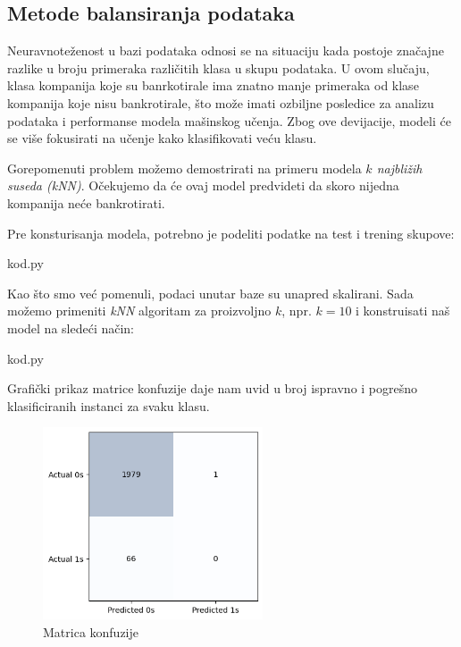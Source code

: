 \documentclass[12pt]{article}
\theoremstyle{definition}
\theoremstyle{remark}
\begin{document}
\newpage

\subsection{Metode balansiranja podataka} 

Neuravnoteženost u bazi podataka odnosi se na situaciju kada postoje značajne razlike u broju primeraka različitih klasa u skupu podataka. U ovom slučaju, klasa kompanija koje su banrkotirale ima znatno manje primeraka od klase kompanija koje nisu bankrotirale, što može imati ozbiljne posledice za analizu podataka i performanse modela mašinskog učenja. Zbog ove devijacije, modeli će se više fokusirati na učenje kako klasifikovati veću klasu. 

Gorepomenuti problem možemo demostrirati na primeru modela
\emph{$k$ najbližih suseda (kNN)}. Očekujemo da će ovaj model predvideti da skoro nijedna kompanija neće bankrotirati. 

Pre konsturisanja modela, potrebno je podeliti podatke na test i trening skupove:

\hfill

{kod.py}

\hfill

Kao što smo već pomenuli, podaci unutar baze su unapred skalirani. Sada možemo primeniti \emph{kNN} algoritam za proizvoljno $k$, npr. $k=10$ i konstruisati naš model na sledeći način:

\hfill

{kod.py}

\hfill



Grafički prikaz matrice konfuzije daje nam uvid u broj ispravno i pogrešno klasificiranih instanci za svaku klasu.

\begin{figure}[htp]
    \centering
    \includegraphics[width=6.5cm]{output_6_0.png}
    \caption{Matrica konfuzije}
    \label{fig:galaxy}
\end{figure}
\end{document}
